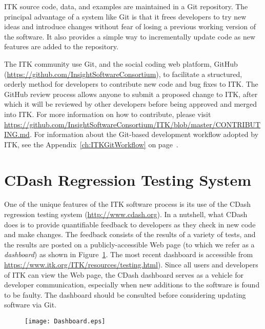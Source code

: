 ITK source code, data, and examples are maintained in a Git repository.  The
principal advantage of a system like Git is that it frees developers to try
new ideas and introduce changes without fear of losing a previous working
version of the software. It also provides a simple way to incrementally
update code as new features are added to the repository.

The ITK community use Git, and the social coding web platform, GitHub
(\url{https://github.com/InsightSoftwareConsortium}), to facilitate a structured,
orderly method for developers to contribute new code and bug fixes to
ITK. The GitHub review process allows anyone to submit a proposed
change to ITK, after which it will be reviewed by other developers
before being approved and merged into ITK.  For more information on how to
contribute, please visit
\url{https://github.com/InsightSoftwareConsortium/ITK/blob/master/CONTRIBUTING.md}.
For information about the Git-based development workflow adopted by ITK,
see the Appendix~\ref{ch:ITKGitWorkflow} on
page~\pageref{ch:ITKGitWorkflow}.


\section{CDash Regression Testing System}
\label{sec:CDash}
\label{sec:QualityDashboard}


One of the unique features of the ITK software process is its use of the CDash
regression testing system (\url{http://www.cdash.org}). In a
nutshell, what CDash does is to provide quantifiable feedback to developers as
they check in new code and make changes. The feedback consists of the results
of a variety of tests, and the results are posted on a publicly-accessible
Web page (to which we refer as a \emph{dashboard}) as shown in
Figure~\ref{fig:Dashboard}. The most recent dashboard is accessible from
\url{https://www.itk.org/ITK/resources/testing.html}). Since all users and developers of
ITK can view the Web page, the CDash dashboard serves as a vehicle for
developer communication, especially when new additions to the software is
found to be faulty.  The dashboard should be consulted before considering
updating software via Git.


\begin{figure}[ht]
\centering
\texttt{[image: Dashboard.eps]}
\label{fig:Dashboard}
\end{figure}

